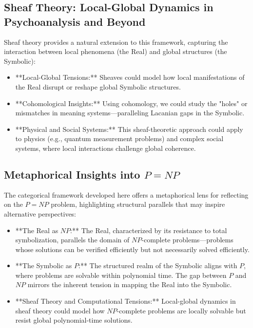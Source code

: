 \documentclass{article}
\begin{document}
\subsection{Sheaf Theory: Local-Global Dynamics in Psychoanalysis and Beyond}

Sheaf theory provides a natural extension to this framework, capturing the interaction between local phenomena (the Real) and global structures (the Symbolic):
\begin{itemize}
    \item **Local-Global Tensions:** Sheaves could model how local manifestations of the Real disrupt or reshape global Symbolic structures.
    \item **Cohomological Insights:** Using cohomology, we could study the "holes" or mismatches in meaning systems—paralleling Lacanian gaps in the Symbolic.
    \item **Physical and Social Systems:** This sheaf-theoretic approach could apply to physics (e.g., quantum measurement problems) and complex social systems, where local interactions challenge global coherence.
\end{itemize}

\subsection{Metaphorical Insights into \( P = NP \)}

The categorical framework developed here offers a metaphorical lens for reflecting on the \( P = NP \) problem, highlighting structural parallels that may inspire alternative perspectives:
\begin{itemize}
    \item **The Real as \( NP \):** The Real, characterized by its resistance to total symbolization, parallels the domain of \( NP \)-complete problems—problems whose solutions can be verified efficiently but not necessarily solved efficiently.
    \item **The Symbolic as \( P \):** The structured realm of the Symbolic aligns with \( P \), where problems are solvable within polynomial time. The gap between \( P \) and \( NP \) mirrors the inherent tension in mapping the Real into the Symbolic.
    \item **Sheaf Theory and Computational Tensions:** Local-global dynamics in sheaf theory could model how \( NP \)-complete problems are locally solvable but resist global polynomial-time solutions.
\end{itemize}
\end{document}
